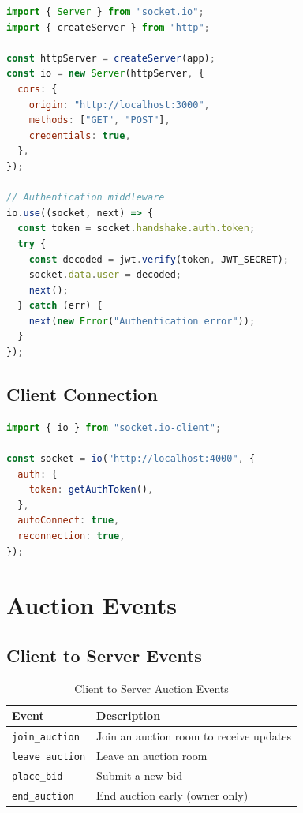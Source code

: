 \documentclass[12pt,a4paper]{report}
\begin{document}
\begin{lstlisting}[language=JavaScript, caption=Socket.IO Server Setup]
import { Server } from "socket.io";
import { createServer } from "http";

const httpServer = createServer(app);
const io = new Server(httpServer, {
  cors: {
    origin: "http://localhost:3000",
    methods: ["GET", "POST"],
    credentials: true,
  },
});

// Authentication middleware
io.use((socket, next) => {
  const token = socket.handshake.auth.token;
  try {
    const decoded = jwt.verify(token, JWT_SECRET);
    socket.data.user = decoded;
    next();
  } catch (err) {
    next(new Error("Authentication error"));
  }
});
\end{lstlisting}

\subsection{Client Connection}

\begin{lstlisting}[language=JavaScript, caption=Socket.IO Client Setup]
import { io } from "socket.io-client";

const socket = io("http://localhost:4000", {
  auth: {
    token: getAuthToken(),
  },
  autoConnect: true,
  reconnection: true,
});
\end{lstlisting}

\section{Auction Events}

\subsection{Client to Server Events}

\begin{table}[H]
\centering
\begin{tabularx}{\textwidth}{|l|X|}
\hline
\textbf{Event} & \textbf{Description} \\
\hline
\texttt{join\_auction} & Join an auction room to receive updates \\
\hline
\texttt{leave\_auction} & Leave an auction room \\
\hline
\texttt{place\_bid} & Submit a new bid \\
\hline
\texttt{end\_auction} & End auction early (owner only) \\
\hline
\end{tabularx}
\caption{Client to Server Auction Events}
\end{table}
\end{document}
